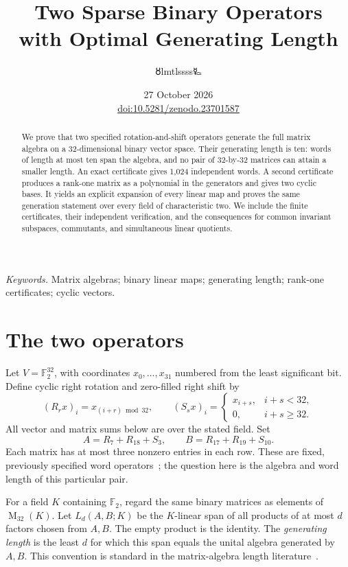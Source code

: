 \documentclass[11pt,a4paper]{article}
\title{\LARGE Two Sparse Binary Operators\\with Optimal Generating Length}
\author{{\authorsymbol 🜘}lmtlssss{\authorsymbol 🜐}}
\date{27 October 2026\\[3pt]{\small\href{https://doi.org/10.5281/zenodo.23701587}{doi:10.5281/zenodo.23701587}}}
\theoremstyle{definition}\newtheorem{definition}[theorem]{Definition}
\newcommand{\F}{\mathbb F_2}
\newcommand{\Mat}{\operatorname{M}}
\begin{document}
\maketitle\thispagestyle{plain}
\begin{abstract}
We prove that two specified rotation-and-shift operators generate the full
matrix algebra on a 32-dimensional binary vector space. Their generating
length is ten: words of length at most ten span the algebra, and no pair of
32-by-32 matrices can attain a smaller length. An exact certificate gives
1,024 independent words. A second certificate produces a rank-one matrix
as a polynomial in the generators and gives two cyclic bases. It yields
an explicit expansion of every linear map and proves the same generation
statement over every field of characteristic two. We include the finite
certificates, their independent verification, and the consequences for
common invariant subspaces, commutants, and simultaneous linear quotients.
\end{abstract}
\noindent\textit{Keywords.} Matrix algebras; binary linear maps; generating
length; rank-one certificates; cyclic vectors.

\section{The two operators}
Let $V=\F^{32}$, with coordinates $x_0,\ldots,x_{31}$ numbered from the
least significant bit. Define cyclic right rotation and zero-filled right
shift by
\begin{equation}\label{eq:shifts}
 (R_rx)_i=x_{(i+r)\bmod32},\qquad
 (S_sx)_i=\begin{cases}x_{i+s},&i+s<32,\\0,&i+s\geq32.\end{cases}
\end{equation}
All vector and matrix sums below are over the stated field. Set
\begin{equation}\label{eq:operators}
 A=R_7+R_{18}+S_3,\qquad B=R_{17}+R_{19}+S_{10}.
\end{equation}
Each matrix has at most three nonzero entries in each row. These are fixed,
previously specified word operators~\cite[Section~5.1]{rfc6234}; the question
here is the algebra and word length of this particular pair.

For a field $K$ containing $\F$, regard the same binary matrices as elements
of $\Mat_{32}(K)$. Let $L_d(A,B;K)$ be the $K$-linear span of all products
of at most $d$ factors chosen from $A,B$. The empty product is the identity.
The \emph{generating length} is the least $d$ for which this span equals the
unital algebra generated by $A,B$. This convention is standard in the
matrix-algebra length literature~\cite{laffey,klep}.
\end{document}
